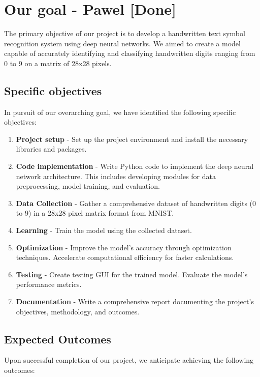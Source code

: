 \documentclass{article}
\begin{document}
\newpage
\section{Our goal - Pawel  [Done]}

The primary objective of our project is to develop a handwritten text symbol recognition system using deep neural networks. We aimed to create a model capable of accurately identifying and classifying handwritten digits ranging from 0 to 9 on a matrix of 28x28 pixels.

\subsection{Specific objectives}

In pursuit of our overarching goal, we have identified the following specific objectives:

\begin{enumerate}
    \item \textbf{Project setup} - Set up the project environment and install the necessary libraries and packages.
    \item \textbf{Code implementation} - Write Python code to implement the deep neural network architecture. This includes developing modules for data preprocessing, model training, and evaluation.
    \item \textbf{Data Collection} - Gather a comprehensive dataset of handwritten digits (0 to 9) in a 28x28 pixel matrix format from MNIST.
	\item \textbf{Learning} - Train the model using the collected dataset.
	\item \textbf{Optimization} - Improve the model's accuracy through optimization techniques. Accelerate computational efficiency for faster calculations.
    \item \textbf{Testing} - Create testing GUI for the trained model. Evaluate the model's performance metrics.
	\item \textbf{Documentation} - Write a comprehensive report documenting the project's objectives, methodology, and outcomes.
\end{enumerate}

\subsection{Expected Outcomes}

Upon successful completion of our project, we anticipate achieving the following outcomes:
\end{document}
